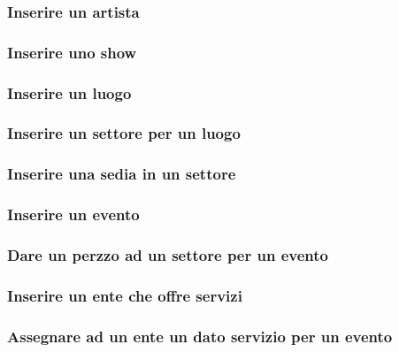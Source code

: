 \documentclass[a4paper,11pt]{article}
\begin{document}
\subsubsection{Inserire un artista}


\subsubsection{Inserire uno show}


\subsubsection{Inserire un luogo}


\subsubsection{Inserire un settore per un luogo}


\subsubsection{Inserire una sedia in un settore}


\subsubsection{Inserire un evento}


\subsubsection{Dare un perzzo ad un settore per un evento}


\subsubsection{Inserire un ente che offre servizi}


\subsubsection{Assegnare ad un ente un dato servizio per un evento}

\end{document}
